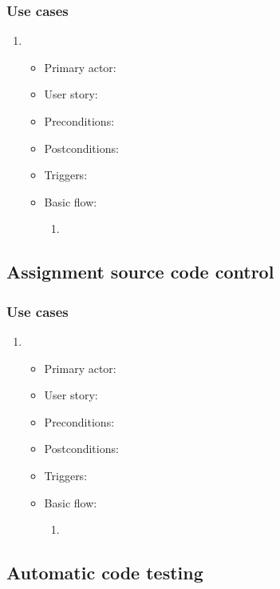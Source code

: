 \subsubsection{Use cases}
\begin{enumerate}
\item 
\begin{itemize}
    \item Primary actor:
    \item User story:
    \item Preconditions:
    \item Postconditions:
    \item Triggers:
    \item Basic flow:
        \begin{enumerate}
            \item 
        \end{enumerate}
\end{itemize}
\end{enumerate}

\subsection{Assignment source code control}
\subsubsection{Use cases}
\begin{enumerate}
\item 
\begin{itemize}
    \item Primary actor:
    \item User story:
    \item Preconditions:
    \item Postconditions:
    \item Triggers:
    \item Basic flow:
        \begin{enumerate}
            \item 
        \end{enumerate}
\end{itemize}
\end{enumerate}

\subsection{Automatic code testing}
